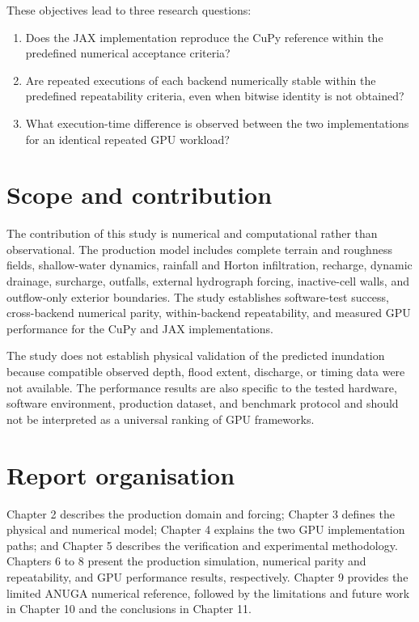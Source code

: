 \documentclass[11pt,a4paper,oneside]{report}
\begin{document}
These objectives lead to three research questions:

\begin{enumerate}
    \item Does the JAX implementation reproduce the CuPy reference within the predefined
    numerical acceptance criteria?
    
    \item Are repeated executions of each backend numerically stable within the predefined
    repeatability criteria, even when bitwise identity is not obtained?
    
    \item What execution-time difference is observed between the two implementations for an
    identical repeated GPU workload?
\end{enumerate}

\section{Scope and contribution}

The contribution of this study is numerical and computational rather than observational. The
production model includes complete terrain and roughness fields, shallow-water dynamics,
rainfall and Horton infiltration, recharge, dynamic drainage, surcharge, outfalls, external
hydrograph forcing, inactive-cell walls, and outflow-only exterior boundaries. The study
establishes software-test success, cross-backend numerical parity, within-backend
repeatability, and measured GPU performance for the CuPy and JAX implementations.

The study does not establish physical validation of the predicted inundation because compatible
observed depth, flood extent, discharge, or timing data were not available. The performance
results are also specific to the tested hardware, software environment, production dataset, and
benchmark protocol and should not be interpreted as a universal ranking of GPU frameworks.

\section{Report organisation}

Chapter 2 describes the production domain and forcing; Chapter 3 defines the physical and
numerical model; Chapter 4 explains the two GPU implementation paths; and Chapter 5
describes the verification and experimental methodology. Chapters 6 to 8 present the
production simulation, numerical parity and repeatability, and GPU performance results,
respectively. Chapter 9 provides the limited ANUGA numerical reference, followed by the
limitations and future work in Chapter 10 and the conclusions in Chapter 11.
\end{document}
